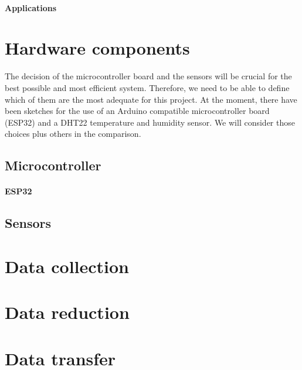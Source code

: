 \documentclass{article}
\begin{document}
\paragraph*{Applications\newline\newline}

\section{Hardware components}

The decision of the microcontroller board and the sensors will be crucial for the best possible and most efficient system. Therefore, we need to be able to define which of them are the most adequate for this project.\newline
At the moment, there have been sketches for the use of an Arduino compatible microcontroller board (ESP32) and a DHT22 temperature and humidity sensor. We will consider those choices plus others in the comparison.

\subsection{Microcontroller}
\paragraph*{ESP32\newline}

\subsection{Sensors}

\section{Data collection}

\section{Data reduction}

\section{Data transfer}

\newpage


\end{document}
